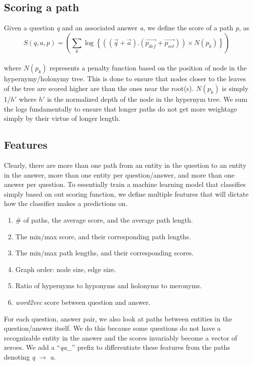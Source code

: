 \subsection{Scoring a path}
Given a question \emph{q} and an associated answer \emph{a}, we define the score of a path \emph{p},
as $$S(q, a, p) = \left(\sum_{k}\log\left\{((\vec{q}+\vec{a}).(\vec{p_{def}}+\vec{p_{set}}))\times N(p_k)\right\}\right)$$\\
where $N(p_k)$ represents a penalty function based on the position of node in the hypernymy/holonymy tree.
This is done to ensure that nodes closer to the leaves of the tree are scored higher are than the ones
near the root(s). $N(p_k)$ is simply 1/$h'$ where $h'$ is the normalized depth of the node in the hypernym tree.
We sum the logs fundamentally to ensure that longer paths do not get more weightage simply by their
virtue of longer length.

\subsection{Features}
Clearly, there are more than one path from an entity in the question to an entity in the answer,
more than one entity per question/answer, and more than one answer per question. To essentially
train a machine learning model that classifies simply based on out scoring function, we define
multiple features that will dictate how the classifier makes a predictions on. 

\begin{enumerate}
\item \# of paths, the average score, and the average path length.
\item The min/max score, and their corresponding path lengths.
\item The min/max path lengths, and their corresponding scores.
\item Graph order: node size, edge size.
\item Ratio of hypernyms to hyponyms and holonyms to meronyms.
\item \emph{word2vec} score between question and answer.
\end{enumerate}

For each question, answer pair, we also look at paths between entities in the question/answer itself.
We do this because some questions do not have a recognizable entity in the answer and the scores
invariably become a vector of zeroes. We add a ``\emph{qa\_}'' prefix to differentiate these
features from the paths denoting \emph{q} $\rightarrow$ \emph{a}.

